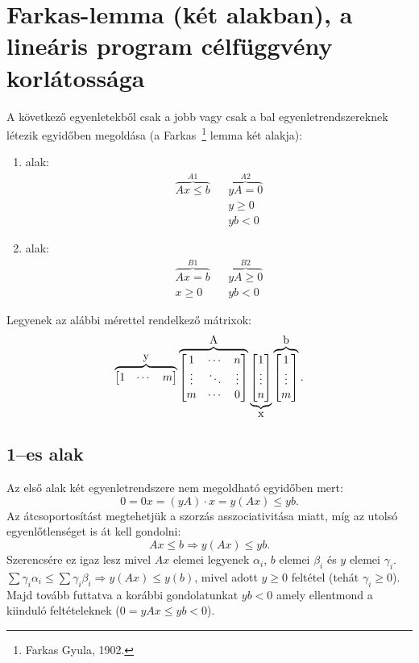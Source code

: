 \skiptooddpage
\section{Farkas-lemma (két alakban), a lineáris program célfüggvény korlátossága}

A következő egyenletekből csak a jobb vagy csak a bal egyenletrendszereknek
létezik egyidőben megoldása (a Farkas~\footnote{Farkas Gyula, 1902.} lemma két
alakja):

\begin{enumerate}
  \item alak: \begin{align*}
  \overbrace{Ax \leq b}^{A1}  && \overbrace{yA= 0}^{A2}\\
   			 && y\geq 0 \\
             && yb< 0
  \end{align*}
  \item alak:\begin{align*}
  \overbrace{Ax = b }^{B1}   && \overbrace{yA \geq 0}^{B2}\\
  x \geq 0 && yb < 0 
  \end{align*}
\end{enumerate}

Legyenek az alábbi mérettel rendelkező mátrixok:
\[
\overbrace{\begin{bmatrix} 1 &  \cdots &  m \end{bmatrix}}^{\hbox{y}} 
\overbrace{\begin{bmatrix} 1 & \cdots & n \\ \vdots & \ddots & \vdots \\ m  & \cdots & 0 \end{bmatrix}}^{\hbox{A}}
\underbrace{\begin{bmatrix} 1 \\ \vdots \\  n \end{bmatrix}}_{\hbox{x}}
\overbrace{\begin{bmatrix} 1 \\ \vdots \\  m \end{bmatrix}}^{\hbox{b}}.
\]

\subsection{1--es alak}
Az első alak két egyenletrendszere nem megoldható egyidőben mert:
\[ 0 = 0x = (yA) \cdot x = y(Ax) \leq yb.\] Az átcsoportosítást megtehetjük a
szorzás asszociativitása miatt, míg az utolsó egyenlőtlenséget is át kell
gondolni: \[ Ax \leq b \Rightarrow y(Ax) \leq yb.\] Szerencsére ez igaz lesz
mivel $Ax$ elemei legyenek $\alpha_i$, $b$ elemei $\beta_i$ és $y$ elemei
$\gamma_i$.
$\sum\gamma_i \alpha_i \leq \sum \gamma_i \beta_i \Rightarrow y(Ax) \leq y(b)$,
mivel adott $y \geq 0$ feltétel (tehát $\gamma_i \geq 0$). Majd tovább futtatva a
korábbi gondolatunkat $yb<0$ amely ellentmond a kiinduló feltételeknek ($0=yAx \leq yb<0$). 

